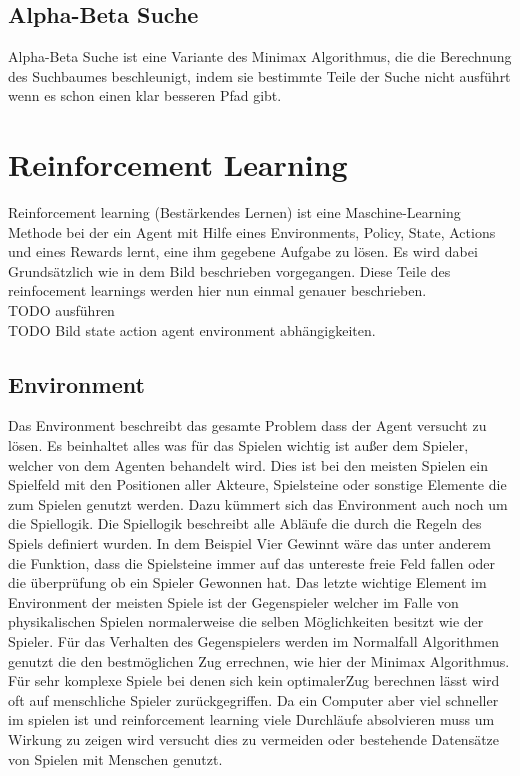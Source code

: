 \subsection{Alpha-Beta Suche}
Alpha-Beta Suche ist eine Variante des Minimax Algorithmus, die die Berechnung des Suchbaumes beschleunigt, indem sie bestimmte Teile der Suche nicht ausführt wenn es schon einen klar besseren Pfad gibt.

\section{Reinforcement Learning}
Reinforcement learning (Bestärkendes Lernen) ist eine Maschine-Learning Methode bei der ein Agent mit Hilfe eines Environments, Policy, State, Actions und eines Rewards lernt, eine ihm gegebene Aufgabe zu lösen. Es wird dabei Grundsätzlich wie in dem  \colorbox{red!30}{Bild} beschrieben vorgegangen. Diese Teile des reinfocement learnings werden hier nun einmal genauer beschrieben.\\
 \colorbox{red!30}{TODO ausführen}\\
\colorbox{red!30}{TODO Bild state action agent environment abhängigkeiten}.

\subsection{Environment}
Das Environment beschreibt das gesamte Problem dass der Agent versucht zu lösen. Es beinhaltet alles was für das Spielen wichtig ist außer dem Spieler, welcher von dem Agenten behandelt wird.  Dies ist bei den meisten Spielen ein Spielfeld mit den Positionen aller Akteure, Spielsteine oder sonstige Elemente die zum Spielen genutzt werden. Dazu kümmert sich das Environment auch noch um die Spiellogik. Die Spiellogik beschreibt alle Abläufe die durch die Regeln des Spiels definiert wurden. In dem Beispiel Vier Gewinnt wäre das unter anderem die Funktion, dass die Spielsteine immer auf das untereste freie Feld fallen oder die überprüfung ob ein Spieler Gewonnen hat. Das letzte wichtige Element im Environment der meisten Spiele ist der Gegenspieler welcher im Falle von physikalischen Spielen normalerweise die selben Möglichkeiten besitzt wie der Spieler. Für das Verhalten des Gegenspielers werden im Normalfall Algorithmen genutzt die den bestmöglichen Zug errechnen, wie hier der Minimax Algorithmus. Für sehr komplexe Spiele bei denen sich kein optimalerZug berechnen lässt wird oft auf menschliche Spieler zurückgegriffen. Da ein Computer aber viel schneller im spielen ist und reinforcement learning viele Durchläufe absolvieren muss um Wirkung zu zeigen wird versucht dies zu vermeiden oder bestehende Datensätze von Spielen mit Menschen genutzt.\\


